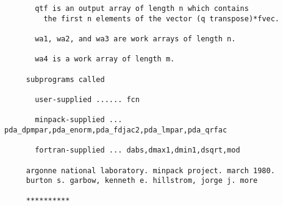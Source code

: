 \begin{verbatim}
       qtf is an output array of length n which contains
         the first n elements of the vector (q transpose)*fvec.

       wa1, wa2, and wa3 are work arrays of length n.

       wa4 is a work array of length m.

     subprograms called

       user-supplied ...... fcn

       minpack-supplied ... pda_dpmpar,pda_enorm,pda_fdjac2,pda_lmpar,pda_qrfac

       fortran-supplied ... dabs,dmax1,dmin1,dsqrt,mod

     argonne national laboratory. minpack project. march 1980.
     burton s. garbow, kenneth e. hillstrom, jorge j. more

     **********
\end{verbatim}




